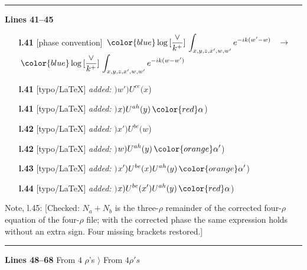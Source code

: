\documentclass[10pt]{article}
\newenvironment{notebox}{\def\FrameCommand{{\color{notebar}\vrule width 1.5pt}\hspace{6pt}}\MakeFramed{\advance\hsize-\width\FrameRestore}\small}{\endMakeFramed}
\begin{document}
\noindent\rule{\linewidth}{0.3pt}\par\noindent\textbf{Lines 41--45} \par
\begin{itemize}[leftmargin=2.2em,itemsep=1pt,topsep=2pt]
\item[\textbf{l.41}] \textsf{\small [phase convention]} $\displaystyle \,{\color{blue}\log{[\frac{\vee}{k^{+}}]}}\,\int_{x,y,z,x^{\prime},w,w^{\prime}}e^{-ik(w^{\prime}-w)}\,$\ $\longrightarrow$\ $\displaystyle \,{\color{blue}\log{[\frac{\vee}{k^{+}}]}}\,\int_{x,y,z,x^{\prime},w,w^{\prime}}e^{-ik(w-w^{\prime})}\,$
\item[\textbf{l.41}] \textsf{\small [typo/LaTeX]} \emph{added:} $\displaystyle )$$\displaystyle w') U^{ce}(x${\color{gray}\small)}
\item[\textbf{l.41}] \textsf{\small [typo/LaTeX]} \emph{added:} $\displaystyle )$$\displaystyle x) U^{a h}(y)\,{\color{red}\alpha}${\color{gray}\small)}
\item[\textbf{l.42}] \textsf{\small [typo/LaTeX]} \emph{added:} $\displaystyle )$$\displaystyle x') U^{be}(w${\color{gray}\small)}
\item[\textbf{l.42}] \textsf{\small [typo/LaTeX]} \emph{added:} $\displaystyle )$$\displaystyle w) U^{a h}(y)\, {\color{orange} \alpha'}${\color{gray}\small)}
\item[\textbf{l.43}] \textsf{\small [typo/LaTeX]} \emph{added:} $\displaystyle )$$\displaystyle x') U^{b e}(x) U^{a h}(y)\, {\color{orange} \alpha'}${\color{gray}\small)}
\item[\textbf{l.44}] \textsf{\small [typo/LaTeX]} \emph{added:} $\displaystyle )$$\displaystyle x) U^{b e}(x') U^{a h}(y)\, {\color{red}\alpha}${\color{gray}\small)}
\end{itemize}
\begin{notebox}\textsf{\small Note, l.45:} [Checked: $N_{a}+N_{b}$ is the three-$\rho$ remainder of the corrected four-$\rho$ equation of the four-$\rho$ file; with the corrected phase the same expression holds without an extra sign. Four missing brackets restored.]\end{notebox}
\noindent\rule{\linewidth}{0.3pt}\par\noindent\textbf{Lines 48--68} \quad \textsf{From $4$ $\rho$'s $\rangle$ From $4 \rho's$} \par
\end{document}
